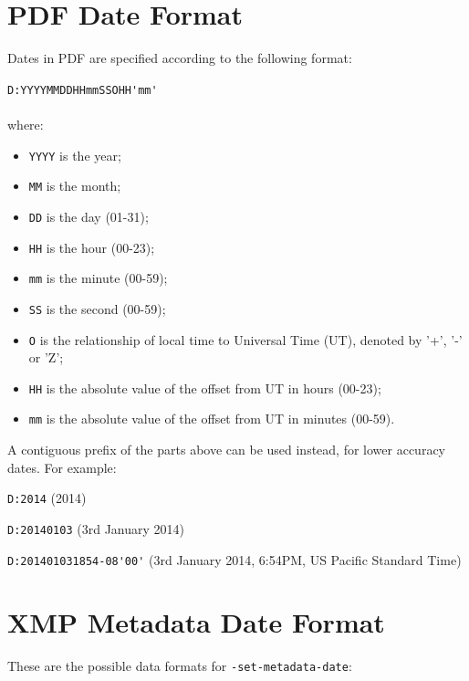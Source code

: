 \documentclass{book}
\begin{document}
\section{PDF Date Format}
Dates in PDF are specified according to the following format:

\begin{framed}
\verb!D:YYYYMMDDHHmmSSOHH'mm'!\\\\where:

\begin{itemize}
  \item \texttt{YYYY} is the year;
  \item \texttt{MM} is the month;
  \item \texttt{DD} is the day (01-31);
  \item \texttt{HH} is the hour (00-23);
  \item \texttt{mm} is the minute (00-59);
  \item \texttt{SS} is the second (00-59);
  \item \texttt{O} is the relationship of local time to Universal Time (UT), denoted by '+', '-' or 'Z';
  \item \texttt{HH} is the absolute value of the offset from UT in hours (00-23);
  \item \texttt{mm} is the absolute value of the offset from UT in minutes (00-59).
\end{itemize}
\end{framed}

\noindent A contiguous prefix of the parts above can be used instead, for lower
accuracy dates. For example:

\begin{framed}
   \small\noindent\verb!D:2014! (2014)
   
   \vspace{1.5mm}
   \noindent\verb!D:20140103! (3rd January 2014)

   \vspace{1.5mm}
   \noindent\verb!D:201401031854-08'00'! (3rd January 2014, 6:54PM, US Pacific Standard Time)
   
\end{framed}

\section{XMP Metadata Date Format}
\label{xmpdate}


These are the possible data formats for \texttt{-set-metadata-date}:
\end{document}
